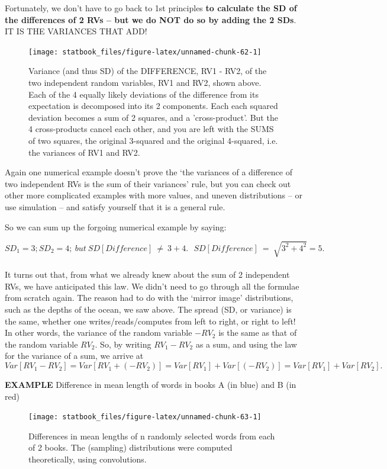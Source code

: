 \documentclass[]{book}
\begin{document}
Fortunately, we don't have to go back to 1st principles \textbf{to calculate the SD of the differences of 2 RVs -- but we do NOT do so by adding the 2 SDs}. IT IS THE VARIANCES THAT ADD!

\begin{figure}

{\centering \texttt{[image: statbook\_files/figure-latex/unnamed-chunk-62-1]} 

}

\caption{Variance (and thus SD) of the DIFFERENCE, RV1 - RV2, of the two independent random variables, RV1 and RV2, shown above. Each of the 4 equally likely deviations of the difference from its expectation is decomposed into its 2 components. Each each squared deviation becomes a sum of 2 squares, and a 'cross-product'. But the 4 cross-products cancel each other, and you are left with the SUMS of two squares, the original 3-squared and the  original 4-squared, i.e. the variances of RV1 and RV2.}\label{fig:unnamed-chunk-62}
\end{figure}

Again one numerical example doesn't prove the `the variances of a difference of two independent RVs is the sum of their variances' rule, but you can check out other more complicated examples with more values, and uneven distributions -- or use simulation -- and satisfy yourself that it is a general rule.

So we can sum up the forgoing numerical example by saying:

\[ SD_1 = 3; SD_2 =4;\  but \ SD[Difference] \ \ne \ 3 + 4. \ \ \  SD[Difference] \ = \ \sqrt{3^2 + 4^2} = 5.\]\\
It turns out that, from what we already knew about the sum of 2 independent RVs, we have anticipated this law. We didn't need to go through all the formulae from scratch again. The reason had to do with the `mirror image' distributions, such as the depths of the ocean, we saw above. The spread (SD, or variance) is the same, whether one writes/reads/computes from left to right, or right to left! In other words, the variance of the random variable \(-RV_2\) is the same as that of the random variable \(RV_2.\) So, by writing \(RV_1 - RV_2\) as a sum, and using the law for the variance of a sum, we arrive at
\[Var[RV_1 - RV_2] = Var[RV_1 + (-RV_2)] = Var[RV_1] + Var[(-RV_2)] = Var[RV_1] + Var[RV_2].\]

\textbf{EXAMPLE} Difference in mean length of words in books A (in blue) and B (in red)

\begin{figure}

{\centering \texttt{[image: statbook\_files/figure-latex/unnamed-chunk-63-1]} 

}

\caption{Differences in  mean lengths of  n randomly selected words from each of 2 books. The (sampling) distributions were computed theoretically, using convolutions.}\label{fig:unnamed-chunk-63}
\end{figure}
\end{document}
